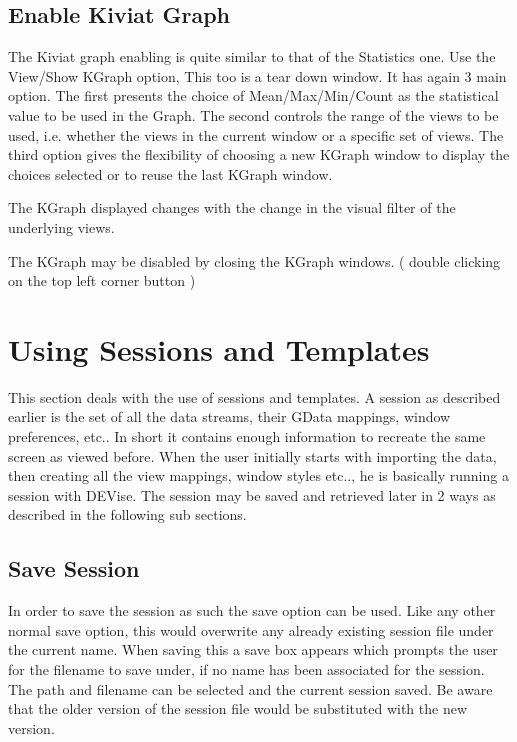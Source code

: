 \subsection{Enable Kiviat Graph}

The Kiviat graph enabling is  quite similar to that of the Statistics one. Use the View/Show KGraph option, This too is a tear down window. It has again 3 main option. The first presents the choice of Mean/Max/Min/Count as the statistical value to be used in the Graph. The second controls the range of the views to be used, i.e. whether the views in the current window or a specific set of views.  The third option gives the flexibility of choosing a new KGraph window to display the choices selected or to reuse the last KGraph window.

The KGraph displayed changes with the change in the visual filter of the underlying views.

The KGraph may be disabled by closing the KGraph windows. ( double clicking on the top left corner button ) 


\section{Using Sessions and Templates}

This section deals with the use of sessions and templates. A session as described earlier is the set of all the data streams, their GData mappings, window preferences, etc.. In short it contains enough information to recreate the same screen as viewed before. When the user initially starts with importing the data, then creating all the view mappings, window styles etc.., he is basically running  a session with DEVise. The session may be saved and retrieved later in  2 ways as described in the following sub sections.

\subsection{Save Session}

In order to save the session as such the save option can be used. Like any other normal save option, this would overwrite any already existing session file under the current name. When saving this a save box appears which prompts the user for the filename to save under, if no name has been associated for the session. The path and filename can be selected and the current session saved. Be aware that the older version of the session file would be substituted with the new version.

